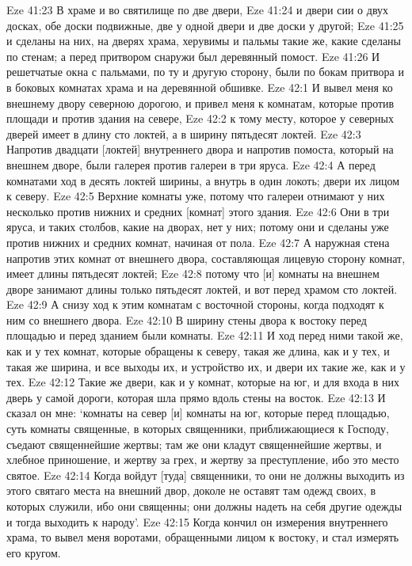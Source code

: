 Eze 41:23  В храме и во святилище по две двери,
Eze 41:24  и двери сии о двух досках, обе доски подвижные, две у одной двери и две доски у другой;
Eze 41:25  и сделаны на них, на дверях храма, херувимы и пальмы такие же, какие сделаны по стенам; а перед притвором снаружи был деревянный помост.
Eze 41:26  И решетчатые окна с пальмами, по ту и другую сторону, были по бокам притвора и в боковых комнатах храма и на деревянной обшивке.
Eze 42:1  И вывел меня ко внешнему двору северною дорогою, и привел меня к комнатам, которые против площади и против здания на севере,
Eze 42:2  к тому месту, которое у северных дверей имеет в длину сто локтей, а в ширину пятьдесят локтей.
Eze 42:3  Напротив двадцати [локтей] внутреннего двора и напротив помоста, который на внешнем дворе, были галерея против галереи в три яруса.
Eze 42:4  А перед комнатами ход в десять локтей ширины, а внутрь в один локоть; двери их лицом к северу.
Eze 42:5  Верхние комнаты уже, потому что галереи отнимают у них несколько против нижних и средних [комнат] этого здания.
Eze 42:6  Они в три яруса, и таких столбов, какие на дворах, нет у них; потому они и сделаны уже против нижних и средних комнат, начиная от пола.
Eze 42:7  А наружная стена напротив этих комнат от внешнего двора, составляющая лицевую сторону комнат, имеет длины пятьдесят локтей;
Eze 42:8  потому что [и] комнаты на внешнем дворе занимают длины только пятьдесят локтей, и вот перед храмом сто локтей.
Eze 42:9  А снизу ход к этим комнатам с восточной стороны, когда подходят к ним со внешнего двора.
Eze 42:10  В ширину стены двора к востоку перед площадью и перед зданием были комнаты.
Eze 42:11  И ход перед ними такой же, как и у тех комнат, которые обращены к северу, такая же длина, как и у тех, и такая же ширина, и все выходы их, и устройство их, и двери их такие же, как и у тех.
Eze 42:12  Такие же двери, как и у комнат, которые на юг, и для входа в них дверь у самой дороги, которая шла прямо вдоль стены на восток.
Eze 42:13  И сказал он мне: `комнаты на север [и] комнаты на юг, которые перед площадью, суть комнаты священные, в которых священники, приближающиеся к Господу, съедают священнейшие жертвы; там же они кладут священнейшие жертвы, и хлебное приношение, и жертву за грех, и жертву за преступление, ибо это место святое.
Eze 42:14  Когда войдут [туда] священники, то они не должны выходить из этого святаго места на внешний двор, доколе не оставят там одежд своих, в которых служили, ибо они священны; они должны надеть на себя другие одежды и тогда выходить к народу'.
Eze 42:15  Когда кончил он измерения внутреннего храма, то вывел меня воротами, обращенными лицом к востоку, и стал измерять его кругом.
